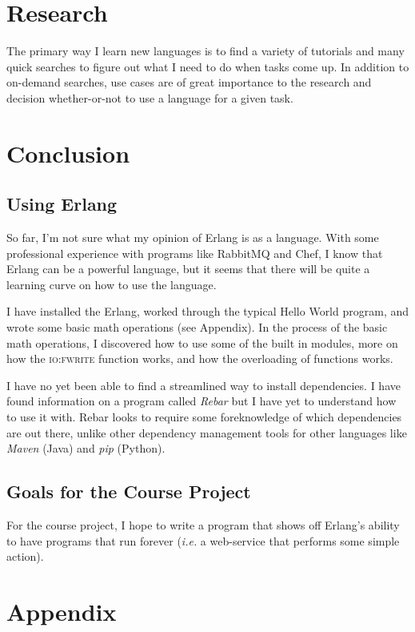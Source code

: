 \documentclass[11 pt]{IEEEtran}
\begin{document}
\section{Research}
The primary way I learn new languages is to find a variety of tutorials and many quick searches to figure out what I need to do when tasks come up. In addition to on-demand searches, use cases are of great importance to the research and decision whether-or-not to use a language for a given task. 


 
\section{Conclusion}
\subsection{Using Erlang}
So far, I'm not sure what my opinion of Erlang is as a language. With some professional experience with programs like RabbitMQ and Chef, I know that Erlang can be a powerful language, but it seems that there will be quite a learning curve on how to use the language.

I have installed the Erlang, worked through the typical Hello World program, and wrote some basic math operations (see Appendix). In the process of the basic math operations, I discovered how to use some of the built in modules, more on how the \textsc{io:fwrite} function works, and how the overloading of functions works.

I have no yet been able to find a streamlined way to install dependencies. I have found information on a program called \emph{Rebar} but I have yet to understand how to use it with. Rebar looks to require some foreknowledge of which dependencies are out there, unlike other dependency management tools for other languages like \emph{Maven} (Java) and \emph{pip} (Python).

\subsection{Goals for the Course Project}
For the course project, I hope to write a program that shows off Erlang's ability to have programs that run forever (\emph{i.e.} a web-service that performs some simple action). 

\newpage
\section{Appendix}
\end{document}
